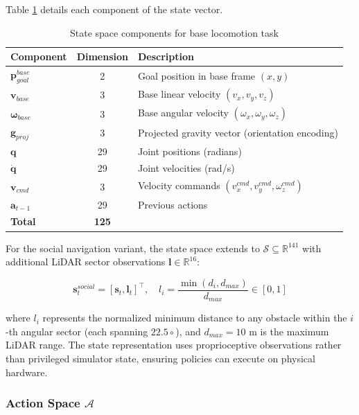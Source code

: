 \documentclass[12pt,a4paper]{article}
\begin{document}
Table \ref{tab:state_space} details each component of the state vector.

\begin{table}[H]
\centering
\caption{State space components for base locomotion task}
\label{tab:state_space}
\footnotesize
\begin{tabular}{l|c|l}
\toprule
\textbf{Component} & \textbf{Dimension} & \textbf{Description} \\
\midrule
$\mathbf{p}_{goal}^{base}$ & 2 & Goal position in base frame $(x, y)$ \\
$\mathbf{v}_{base}$ & 3 & Base linear velocity $(v_x, v_y, v_z)$ \\
$\boldsymbol{\omega}_{base}$ & 3 & Base angular velocity $(\omega_x, \omega_y, \omega_z)$ \\
$\mathbf{g}_{proj}$ & 3 & Projected gravity vector (orientation encoding) \\
$\mathbf{q}$ & 29 & Joint positions (radians) \\
$\dot{\mathbf{q}}$ & 29 & Joint velocities (rad/s) \\
$\mathbf{v}_{cmd}$ & 3 & Velocity commands $(v_x^{cmd}, v_y^{cmd}, \omega_z^{cmd})$ \\
$\mathbf{a}_{t-1}$ & 29 & Previous actions \\
\midrule
\textbf{Total} & \textbf{125} & \\
\bottomrule
\end{tabular}
\end{table}

For the social navigation variant, the state space extends to $\mathcal{S} \subseteq \mathbb{R}^{141}$ with additional LiDAR sector observations $\mathbf{l} \in \mathbb{R}^{16}$:

\begin{equation}
\mathbf{s}_t^{social} = \left[ \mathbf{s}_t, \mathbf{l}_t \right]^\top, \quad l_i = \frac{\min(d_i, d_{max})}{d_{max}} \in [0, 1]
\end{equation}

where $l_i$ represents the normalized minimum distance to any obstacle within the $i$-th angular sector (each spanning $22.5\circ$), and $d_{max} = 10$ m is the maximum LiDAR range. The state representation uses proprioceptive observations rather than privileged simulator state, ensuring policies can execute on physical hardware.

\subsubsection{Action Space $\mathcal{A}$}
\end{document}
